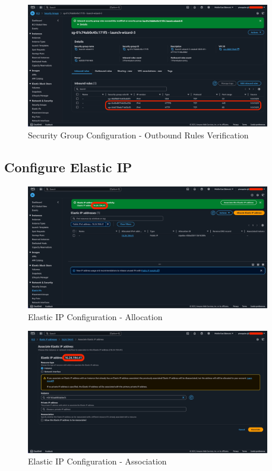 \documentclass[a4paper,12pt]{article}
\begin{document}
\begin{figure}[H]
    \centering
    \includegraphics[width=0.95\textwidth]{security-groups-2.png}
    \caption{Security Group Configuration - Outbound Rules Verification}
    \label{fig:security2}
\end{figure}

\newpage

\subsection{Configure Elastic IP}

\begin{figure}[H]
    \centering
    \includegraphics[width=0.95\textwidth]{elastic-ip-1.png}
    \caption{Elastic IP Configuration - Allocation}
    \label{fig:elastic1}
\end{figure}

\begin{figure}[H]
    \centering
    \includegraphics[width=0.95\textwidth]{elastic-ip-2.png}
    \caption{Elastic IP Configuration - Association}
    \label{fig:elastic2}
\end{figure}
\end{document}
